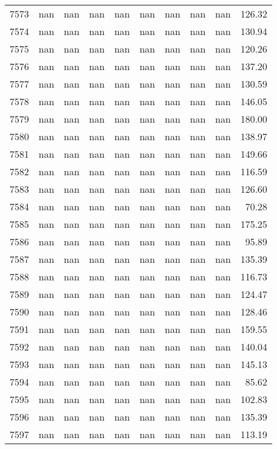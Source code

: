 \begin{tabular}{lrrrrrrrrr}
7573 & nan & nan & nan & nan & nan & nan & nan & nan & 126.32 \\
7574 & nan & nan & nan & nan & nan & nan & nan & nan & 130.94 \\
7575 & nan & nan & nan & nan & nan & nan & nan & nan & 120.26 \\
7576 & nan & nan & nan & nan & nan & nan & nan & nan & 137.20 \\
7577 & nan & nan & nan & nan & nan & nan & nan & nan & 130.59 \\
7578 & nan & nan & nan & nan & nan & nan & nan & nan & 146.05 \\
7579 & nan & nan & nan & nan & nan & nan & nan & nan & 180.00 \\
7580 & nan & nan & nan & nan & nan & nan & nan & nan & 138.97 \\
7581 & nan & nan & nan & nan & nan & nan & nan & nan & 149.66 \\
7582 & nan & nan & nan & nan & nan & nan & nan & nan & 116.59 \\
7583 & nan & nan & nan & nan & nan & nan & nan & nan & 126.60 \\
7584 & nan & nan & nan & nan & nan & nan & nan & nan & 70.28 \\
7585 & nan & nan & nan & nan & nan & nan & nan & nan & 175.25 \\
7586 & nan & nan & nan & nan & nan & nan & nan & nan & 95.89 \\
7587 & nan & nan & nan & nan & nan & nan & nan & nan & 135.39 \\
7588 & nan & nan & nan & nan & nan & nan & nan & nan & 116.73 \\
7589 & nan & nan & nan & nan & nan & nan & nan & nan & 124.47 \\
7590 & nan & nan & nan & nan & nan & nan & nan & nan & 128.46 \\
7591 & nan & nan & nan & nan & nan & nan & nan & nan & 159.55 \\
7592 & nan & nan & nan & nan & nan & nan & nan & nan & 140.04 \\
7593 & nan & nan & nan & nan & nan & nan & nan & nan & 145.13 \\
7594 & nan & nan & nan & nan & nan & nan & nan & nan & 85.62 \\
7595 & nan & nan & nan & nan & nan & nan & nan & nan & 102.83 \\
7596 & nan & nan & nan & nan & nan & nan & nan & nan & 135.39 \\
7597 & nan & nan & nan & nan & nan & nan & nan & nan & 113.19 \\

\end{tabular}
